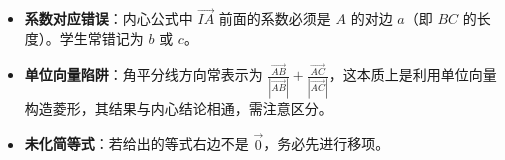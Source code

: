 \begin{trapbox}
\begin{itemize}
    \item \textbf{系数对应错误}：内心公式中 $\vec{IA}$ 前面的系数必须是 $A$ 的对边 $a$（即 $BC$ 的长度）。学生常错记为 $b$ 或 $c$。
    \item \textbf{单位向量陷阱}：角平分线方向常表示为 $\frac{\vec{AB}}{|\vec{AB}|} + \frac{\vec{AC}}{|\vec{AC}|}$，这本质上是利用单位向量构造菱形，其结果与内心结论相通，需注意区分。
    \item \textbf{未化简等式}：若给出的等式右边不是 $\vec{0}$，务必先进行移项。
\end{itemize}
\end{trapbox}